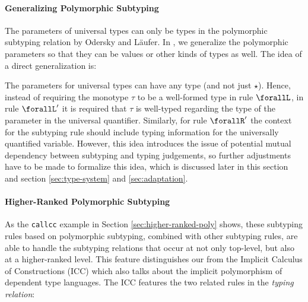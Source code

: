 \paragraph{Generalizing Polymorphic Subtyping}
\label{sec:polymorphic-subtyping}

The parameters of universal types can only be types in the polymorphic
subtyping relation by Odersky and L\"aufer.
In \name, we generalize the polymorphic parameters so that they can
be values or other kinds of types as well.
The idea of a direct generalization is:


\noindent The parameters for universal types can have any type (and not just $\star$).
Hence, instead of requiring the monotype $\tau$ to be a well-formed type in rule
$\forallL$, in rule $\forallL'$ it is
required that $\tau$ is well-typed regarding the type of the parameter
in the universal quantifier.
Similarly, for rule $\forallR'$ the context for the subtyping rule should include typing information
for the universally quantified variable.
However, this idea introduces the issue of potential mutual dependency between
subtyping and typing judgements, so further adjustments have to be made to formalize
this idea, which is discussed later in this section and section
\ref{sec:type-system} and \ref{sec:adaptation}.

\paragraph{Higher-Ranked Polymorphic Subtyping}

As the \verb|callcc| example in Section \ref{sec:higher-ranked-poly} shows, these subtyping
rules based on polymorphic subtyping, combined with other subtyping rules,
are able to handle the subtyping relations that occur at not only top-level,
but also at a higher-ranked level. This feature distinguishes our \name from the
Implicit Calculus of Constructions (ICC) \cite{miquel2001implicit} which also talks about
the implicit polymorphism of dependent type languages. The ICC features the two related rules
in the \emph{typing relation}:

